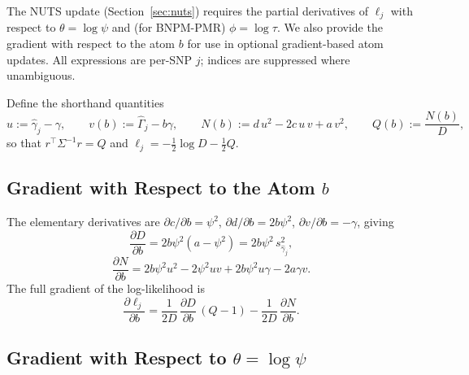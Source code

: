 \documentclass[12pt, a4paper]{article}
\theoremstyle{remark}
\begin{document}
The NUTS update (Section~\ref{sec:nuts}) requires the partial derivatives
of $\ell_j$ with respect to $\theta = \log\psi$ and (for BNPM-PMR)
$\phi = \log\tau$.  We also provide the gradient with respect to the
atom $b$ for use in optional gradient-based atom updates.
All expressions are per-SNP $j$; indices are suppressed where
unambiguous.

Define the shorthand quantities
\begin{equation}
  u := \hat\gamma_j - \gamma, \qquad
  v(b) := \hat\Gamma_j - b\gamma, \qquad
  N(b) := d\,u^2 - 2c\,u\,v + a\,v^2, \qquad
  Q(b) := \frac{N(b)}{D},
\label{eq:uvNQ}
\end{equation}
so that $r^\top\Sigma^{-1}r = Q$ and
$\ell_j = -\tfrac{1}{2}\log D - \tfrac{1}{2}Q$.

\subsection{Gradient with Respect to the Atom \texorpdfstring{$b$}{b}}

The elementary derivatives are
$\partial c/\partial b = \psi^2$, $\partial d/\partial b = 2b\psi^2$,
$\partial v/\partial b = -\gamma$, giving
\begin{equation}
  \frac{\partial D}{\partial b}
  = 2b\psi^2(a - \psi^2)
  = 2b\psi^2\,s^2_{\hat\gamma_j},
\label{eq:dD_db}
\end{equation}
\begin{equation}
  \frac{\partial N}{\partial b}
  = 2b\psi^2 u^2 - 2\psi^2 uv
    + 2b\psi^2 u\gamma - 2a\gamma v.
\label{eq:dN_db}
\end{equation}
The full gradient of the log-likelihood is
\begin{equation}
  \boxed{
  \frac{\partial \ell_j}{\partial b}
  = \frac{1}{2D}\,\frac{\partial D}{\partial b}\,(Q - 1)
    - \frac{1}{2D}\,\frac{\partial N}{\partial b}.
  }
\label{eq:grad_b}
\end{equation}

\subsection{Gradient with Respect to \texorpdfstring{$\theta = \log\psi$}{theta}}
\end{document}

